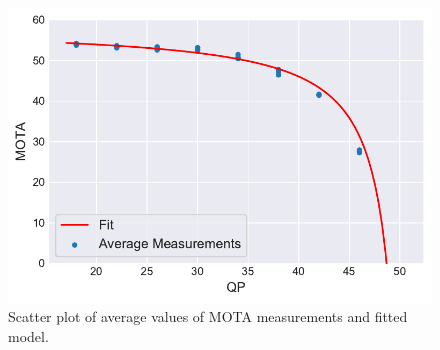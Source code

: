 \begin{figure}[!tb]
  \centering
  \includegraphics[width=0.8\linewidth]{img/MOTA_vs_QP_formulation.pdf}
  \caption[Scatter plot of average values of MOTA measurements and fitted model]
  {Scatter plot of average values of MOTA measurements and fitted model.}
  \label{fig:MOTA_vs_QP_formulation}
\end{figure}
